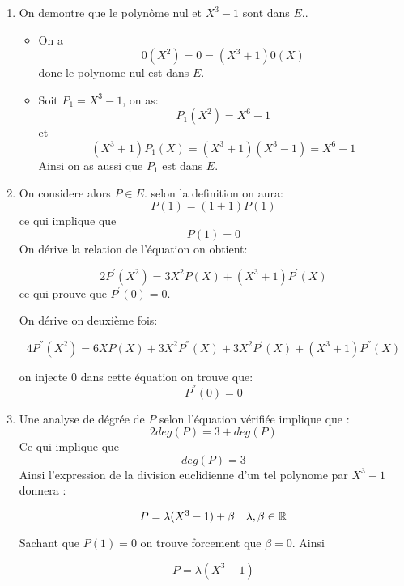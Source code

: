 \documentclass{report}
\begin{document}
\begin{myproof}
  \begin{enumerate}
    \item On demontre que le polynôme nul et $X^3-1$ sont dans $E$..
      \begin{itemize}
        \item On a 
          $$ 0(X^2) = 0 = (X^3+1)0(X) $$ donc le polynome nul est dans $E$.
        \item Soit $P_1 = X^3 - 1$, on as:
          $$
          P_1(X^2) = X^6 - 1
          $$
          et 
          $$
          (X^3+1)P_1(X) = (X^3+1)(X^3-1) = X^6 - 1
          $$
          Ainsi on as aussi que $P_1$ est dans $E$.
      \end{itemize}
    \item On considere alors $P\in E$. selon la definition on aura:
      $$
      P(1) = (1 + 1) P(1)
      $$
      ce qui implique que 
      $$
      P(1) = 0
      $$
      On dérive la relation de l'équation on obtient:

      $$
      2P^{'}(X^2) = 3X^2P(X) + (X^3+1)P^{'}(X)
      $$
      ce qui prouve que $P^{'}(0)= 0$.

      On dérive on deuxième fois:

      $$
      4P^{''}(X^2) = 6XP(X) + 3X^2P^{''}(X) + 3X^2P^{'}(X) + (X^3+1)P^{''}(X)
      $$

      on injecte $0$ dans cette équation on trouve que:
      $$
      P^{''}(0) = 0
      $$
    \item Une analyse de dégrée de $P$ selon l'équation vérifiée implique que :
      $$
      2deg(P) = 3  + deg(P)
      $$
      Ce qui implique que 
      $$
      deg(P) = 3
      $$
      Ainsi l'expression de la division euclidienne d'un tel polynome par $X^3-1$ donnera :

      $$
      P = \lambda (X^3 - 1) + \beta\quad \lambda,\beta \in \mathbb{R}
      $$

      Sachant que $P(1) = 0$ on trouve forcement que $\beta =0$.
      Ainsi

      $$
      P = \lambda (X^3-1)
      $$

  \end{enumerate}
\end{myproof}
\end{document}
